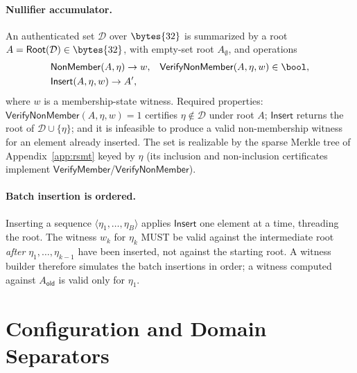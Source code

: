 \paragraph{Nullifier accumulator.}
An authenticated set $\mathcal{D}$ over $\bytes{32}$ is summarized by a root $A = \mathsf{Root}(\mathcal{D}) \in \bytes{32}$, with empty-set root $A_\emptyset$, and operations
\[
\begin{aligned}
&\mathsf{NonMember}(A,\eta) \to w, &&\mathsf{VerifyNonMember}(A,\eta,w) \in \bool,\\
&\mathsf{Insert}(A,\eta,w) \to A',
\end{aligned}
\]
where $w$ is a membership-state witness. Required properties: $\mathsf{VerifyNonMember}(A,\eta,w)=1$ certifies $\eta \notin \mathcal{D}$ under root $A$; $\mathsf{Insert}$ returns the root of $\mathcal{D}\cup\{\eta\}$; and it is infeasible to produce a valid non-membership witness for an element already inserted. The set is realizable by the sparse Merkle tree of Appendix~\ref{app:rsmt} keyed by $\eta$ (its inclusion and non-inclusion certificates implement $\mathsf{VerifyMember}$/$\mathsf{VerifyNonMember}$).

\paragraph{Batch insertion is ordered.}
Inserting a sequence $\langle\eta_1,\ldots,\eta_B\rangle$ applies $\mathsf{Insert}$ one element at a time, threading the root. The witness $w_k$ for $\eta_k$ MUST be valid against the intermediate root \emph{after} $\eta_1,\ldots,\eta_{k-1}$ have been inserted, not against the starting root. A witness builder therefore simulates the batch insertions in order; a witness computed against $A_\mathsf{old}$ is valid only for $\eta_1$.

\section{Configuration and Domain Separators}\label{app:bridging-config}


